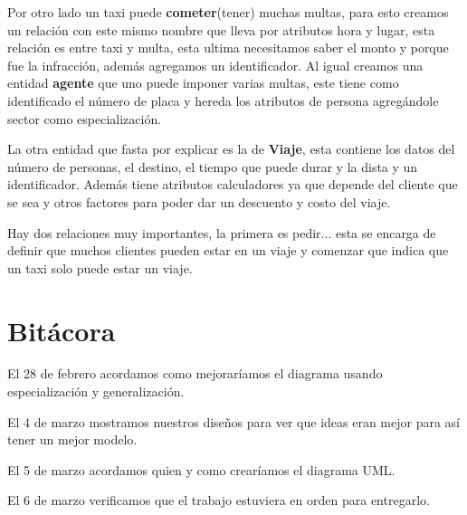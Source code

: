 \documentclass{article}
\begin{document}
	Por otro lado un taxi puede \textbf{cometer}(tener) muchas multas, para esto creamos un relación con este mismo nombre que lleva por atributos hora y lugar, esta relación es entre taxi y multa, esta ultima necesitamos saber el monto y porque fue la infracción, además agregamos un identificador. Al igual creamos una entidad \textbf{agente} que uno puede imponer varias multas, este tiene como identificado el número de placa y hereda los atributos de persona agregándole sector como especialización.
	
	La otra entidad que fasta por explicar es la de \textbf{Viaje}, esta contiene los datos del número de personas, el destino, el tiempo que puede durar y la dista y un identificador. Además tiene atributos calculadores ya que depende del cliente que se sea y otros factores para poder dar un descuento y costo del viaje.
	
	Hay dos relaciones muy importantes, la primera es pedir... esta se encarga de definir que muchos clientes pueden estar en un viaje y comenzar que indica que un taxi solo puede estar un viaje.

	\section{Bitácora}
	El 28 de febrero acordamos como mejoraríamos el diagrama usando especialización y generalización.
	
	El 4 de marzo mostramos nuestros diseños para ver que ideas eran mejor para así tener un mejor modelo. 
	
	El 5 de marzo acordamos quien y como crearíamos el diagrama UML.
	
	El 6 de marzo verificamos que el trabajo estuviera en orden para entregarlo.
	
\end{document}
